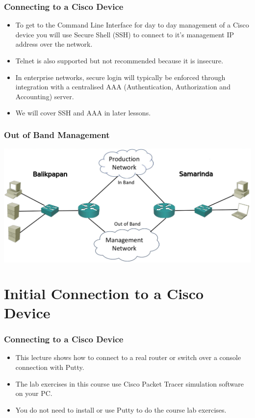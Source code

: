 \documentclass[pdflatex,compress]{beamer}
\begin{document}
\begin{frame}
	\frametitle{Connecting to a Cisco Device}
	\begin{itemize}
		\item To get to the Command Line Interface for day to day management of a Cisco device you will use Secure Shell (SSH) to connect to it’s management IP address over the network.
		\item Telnet is also supported but not recommended because it is insecure.
		\item In enterprise networks, secure login will typically be enforced through integration with a centralised AAA (Authentication, Authorization and Accounting) server.
		\item We will cover SSH and AAA in later lessons.
	\end{itemize}
\end{frame}

\begin{frame}
	\frametitle{Out of Band Management}
	\begin{center}
		\includegraphics[width=1\linewidth]{img/img02}
	\end{center}
\end{frame}

\section{Initial Connection to a Cisco Device}

\begin{frame}
	\frametitle{Connecting to a Cisco Device}
	\begin{itemize}
		\item This lecture shows how to connect to a real router or switch over a console connection with Putty.
		\item The lab exercises in this course use Cisco Packet Tracer simulation software on your PC.
		\item You do not need to install or use Putty to do the course lab exercises.
	\end{itemize}
\end{frame}
\end{document}
